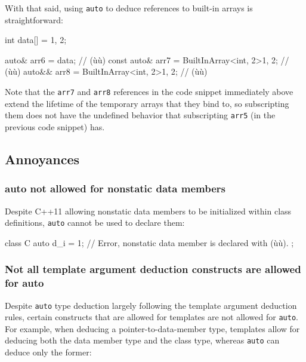 With that said, using \lstinline!auto! to deduce
references to built-in arrays is straightforward:

\begin{emcppslisting}[emcppsbatch=e21]
int data[] = {1, 2};

      auto&  arr6 = data;                        //       (ù{}ù)
const auto&  arr7 = BuiltInArray<int, 2>{1, 2};  // (ù{}ù)
      auto&& arr8 = BuiltInArray<int, 2>{1, 2};  //       (ù{}ù)
\end{emcppslisting}
    
\noindent Note that the \lstinline!arr7! and \lstinline!arr8! references in the code snippet immediately above extend
the lifetime of the temporary arrays that they bind to, so subscripting
them does not have the undefined behavior that subscripting
\lstinline!arr5! (in the previous code snippet) has.

\subsection[Annoyances]{Annoyances}\label{annoyances-auto}

\subsubsection[\lstinline!auto! not allowed for nonstatic data members]{{\SubsubsecCode auto} not allowed for nonstatic data members}\label{auto-not-allowed-for-non-static-data-members}

Despite C++11 allowing nonstatic data members to be initialized within
class definitions, \lstinline!auto! cannot be used to declare them:

\begin{emcppslisting}
class C
{
    auto d_i = 1;  // Error, nonstatic data member is declared with (ù{}ù).
};
\end{emcppslisting}
    

\subsubsection[Not all template argument deduction constructs are allowed for \lstinline!auto!]{Not all template argument deduction constructs are allowed for {\SubsubsecCode auto}}\label{not-all-template-argument-deduction-constructs-are-allowed-for-auto}

Despite \lstinline!auto! type deduction largely following the template
argument deduction rules, certain constructs that are allowed for
templates are not allowed for \lstinline!auto!. For example, when deducing
a pointer-to-data-member type, templates allow for deducing both the
data member type and the class type, whereas \lstinline!auto! can 
deduce only the former:

